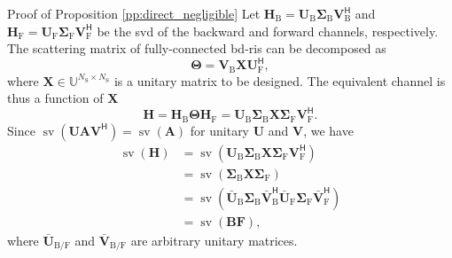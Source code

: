 \documentclass[journal]{IEEEtran}
\DeclareMathOperator{\sv}{sv}
\begin{document}
\begin{appendix}
	\begin{subsection}{Proof of Proposition \ref{pp:direct_negligible}}\label{ap:direct_negligible}
		Let $\mathbf{H}_\mathrm{B} = \mathbf{U}_\mathrm{B} \mathbf{\Sigma}_\mathrm{B} \mathbf{V}_\mathrm{B}^\mathsf{H}$ and $\mathbf{H}_\mathrm{F} = \mathbf{U}_\mathrm{F} \mathbf{\Sigma}_\mathrm{F} \mathbf{V}_\mathrm{F}^\mathsf{H}$ be the \gls{svd} of the backward and forward channels, respectively.
		The scattering matrix of fully-connected \gls{bd}-\gls{ris} can be decomposed as
		\begin{equation}
			\mathbf{\Theta} = \mathbf{V}_\mathrm{B} \mathbf{X} \mathbf{U}_\mathrm{F}^\mathsf{H},
			\label{eq:scattering_fc}
		\end{equation}
		where $\mathbf{X} \in \mathbb{U}^{N_\mathrm{S} \times N_\mathrm{S}}$ is a unitary matrix to be designed.
		The equivalent channel is thus a function of $\mathbf{X}$
		\begin{equation}
			\mathbf{H} = \mathbf{H}_\mathrm{B} \mathbf{\Theta} \mathbf{H}_\mathrm{F} = \mathbf{U}_\mathrm{B} \mathbf{\Sigma}_\mathrm{B} \mathbf{X} \mathbf{\Sigma}_\mathrm{F} \mathbf{V}_\mathrm{F}^\mathsf{H}.
			\label{eq:channel_equivalent_fc}
		\end{equation}
		Since $\sv(\mathbf{U} \mathbf{A} \mathbf{V}^\mathsf{H}) = \sv(\mathbf{A})$ for unitary $\mathbf{U}$ and $\mathbf{V}$, we have
		\begin{align*}
			\sv(\mathbf{H}) & = \sv(\mathbf{U}_\mathrm{B} \mathbf{\Sigma}_\mathrm{B} \mathbf{X} \mathbf{\Sigma}_\mathrm{F} \mathbf{V}_\mathrm{F}^\mathsf{H})                                                                     \\
			                        & = \sv(\mathbf{\Sigma}_\mathrm{B} \mathbf{X} \mathbf{\Sigma}_\mathrm{F})                                                                                                                            \\
			                        & = \sv(\bar{\mathbf{U}}_\mathrm{B} \mathbf{\Sigma}_\mathrm{B} \mathbf{\bar{V}}_\mathrm{B}^\mathsf{H} \bar{\mathbf{U}}_\mathrm{F} \mathbf{\Sigma}_\mathrm{F} \mathbf{\bar{V}}_\mathrm{F}^\mathsf{H}) \\
			                        & = \sv(\mathbf{BF}),
		\end{align*}
		where $\bar{\mathbf{U}}_{\mathrm{B}/\mathrm{F}}$ and $\bar{\mathbf{V}}_{\mathrm{B}/\mathrm{F}}$ are arbitrary unitary matrices.
	\end{subsection}


\end{appendix}
\end{document}
